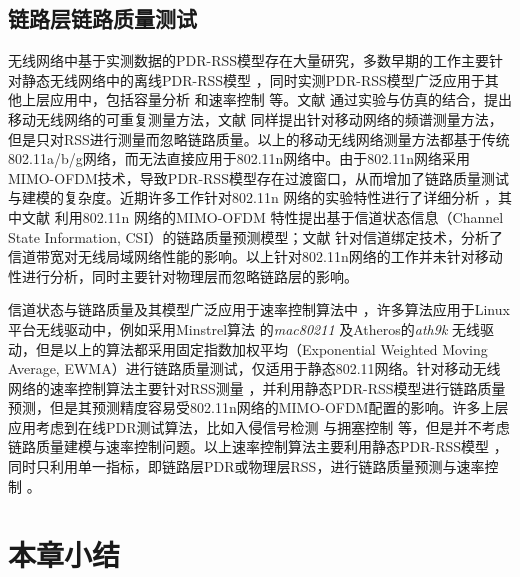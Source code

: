 \subsection{链路层链路质量测试}
\label{sec:mac}

无线网络中基于实测数据的PDR-RSS模型存在大量研究，多数早期的工作主要针对静态无线网络中的离线PDR-RSS模型 \cite{kolar2011mesh} \cite{reis2006model}，同时实测PDR-RSS模型广泛应用于其他上层应用中，包括容量分析 \cite{kashyap2007capacity} 和速率控制 \cite{chen2011ram} \cite{judd2008efficient} 等。文献 \cite{10.1109/TMC.2009.87} 通过实验与仿真的结合，提出移动无线网络的可重复测量方法，文献 \cite{kim2010sybot} 同样提出针对移动网络的频谱测量方法，但是只对RSS进行测量而忽略链路质量。以上的移动无线网络测量方法都基于传统802.11a/b/g网络，而无法直接应用于802.11n网络中。由于802.11n网络采用MIMO-OFDM技术，导致PDR-RSS模型存在过渡窗口，从而增加了链路质量测试与建模的复杂度。近期许多工作针对802.11n 网络的实验特性进行了详细分析 \cite{Halperin2010predictable} \cite{k.rayanchu:fluid:}，其中文献 \cite{Halperin2010predictable} 利用802.11n 网络的MIMO-OFDM 特性提出基于信道状态信息（Channel State Information, CSI）的链路质量预测模型；文献 \cite{k.rayanchu:fluid:} 针对信道绑定技术，分析了信道带宽对无线局域网络性能的影响。以上针对802.11n网络的工作并未针对移动性进行分析，同时主要针对物理层而忽略链路层的影响。

信道状态与链路质量及其模型广泛应用于速率控制算法中 \cite{kim2009experimental} \cite{Pefkianakis:2010} \cite{zhang2008practical} \cite{Li:2012:ERA:2348543.2348585}，许多算法应用于Linux平台无线驱动中，例如采用Minstrel算法 \cite{minstrel} 的\textit{mac80211} 及Atheros的\textit{ath9k} 无线驱动\cite{wong2008wireless}，但是以上的算法都采用固定指数加权平均（Exponential Weighted Moving Average, EWMA）进行链路质量测试，仅适用于静态802.11网络。针对移动无线网络的速率控制算法主要针对RSS测量 \cite{chen2011ram} \cite{judd2008efficient}，并利用静态PDR-RSS模型进行链路质量预测，但是其预测精度容易受802.11n网络的MIMO-OFDM配置的影响。许多上层应用考虑到在线PDR测试算法，比如入侵信号检测 \cite{5620919} 与拥塞控制 \cite{floyd2000equation} 等，但是并不考虑链路质量建模与速率控制问题。以上速率控制算法主要利用静态PDR-RSS模型 \cite{kashyap2007capacity} \cite{kolar2011mesh} \cite{reis2006model}，同时只利用单一指标，即链路层PDR或物理层RSS，进行链路质量预测与速率控制 \cite{judd2008efficient} \cite{zhang2008practical}。

\section{本章小结}

